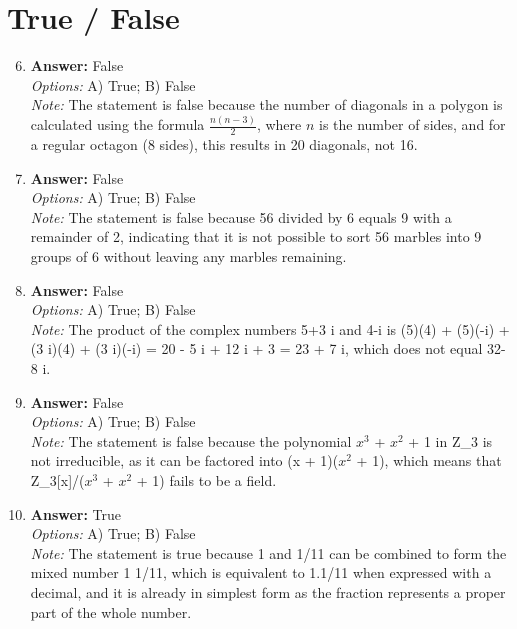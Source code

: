 \documentclass[12pt]{article}
\begin{document}
\section*{True / False}
\begin{enumerate}[label=\arabic*.]
\setcounter{enumi}{5}
\item \textbf{Answer:} False
\\ \textit{Options:} A) True; B) False
\\ \textit{Note:} The statement is false because the number of diagonals in a polygon is calculated using the formula \( \frac{n(n-3)}{2} \), where \( n \) is the number of sides, and for a regular octagon (8 sides), this results in 20 diagonals, not 16.
\item \textbf{Answer:} False
\\ \textit{Options:} A) True; B) False
\\ \textit{Note:} The statement is false because 56 divided by 6 equals 9 with a remainder of 2, indicating that it is not possible to sort 56 marbles into 9 groups of 6 without leaving any marbles remaining.
\item \textbf{Answer:} False
\\ \textit{Options:} A) True; B) False
\\ \textit{Note:} The product of the complex numbers 5+3 i and 4-i is (5)(4) + (5)(-i) + (3 i)(4) + (3 i)(-i) = 20 - 5 i + 12 i + 3 = 23 + 7 i, which does not equal 32-8 i.
\item \textbf{Answer:} False
\\ \textit{Options:} A) True; B) False
\\ \textit{Note:} The statement is false because the polynomial $x^3$ + $x^2$ + 1 in Z\_3 is not irreducible, as it can be factored into (x + 1)($x^2$ + 1), which means that Z\_3[x]/($x^3$ + $x^2$ + 1) fails to be a field.
\item \textbf{Answer:} True
\\ \textit{Options:} A) True; B) False
\\ \textit{Note:} The statement is true because 1 and 1/11 can be combined to form the mixed number 1 1/11, which is equivalent to 1.1/11 when expressed with a decimal, and it is already in simplest form as the fraction represents a proper part of the whole number.
\end{enumerate}
\end{document}
